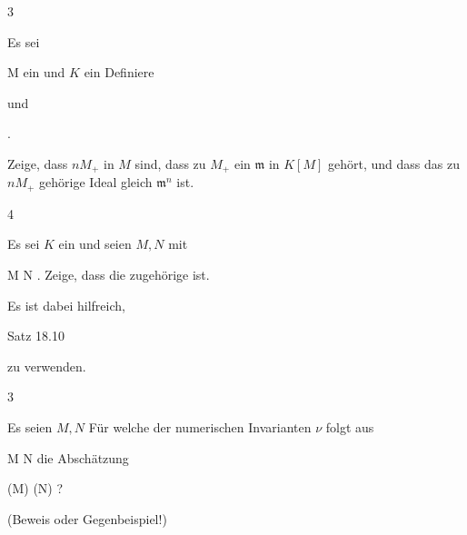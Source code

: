 {3}
{





Es sei

\mavergleichskette
{\vergleichskette
{ M
}
{ \subseteq }{ \N
}
{  }{
}
{    }{
}
{   }{
}
}
{}{}{}
ein
und $K$ ein
Definiere

 {  }

und

 { . }

Zeige, dass $nM_+$  in $M$ sind, dass zu $M_+$ ein
${\mathfrak m}$ in $K[M]$ gehört, und dass das zu $nM_+$ gehörige Ideal gleich ${\mathfrak m}^n$ ist.





}
{} {}

{4}
{





Es sei $K$ ein
und seien $M,N$
mit

\mavergleichskette
{\vergleichskette
{ M
}
{ \subseteq }{ N
}
{  }{
}
{    }{
}
{   }{
}
}
{}{}{.}
Zeige, dass die zugehörige
ist.





}
{Es ist dabei hilfreich,

Satz 18.10

zu verwenden.} {}

{3}
{





Es seien $M,N$
Für welche der numerischen Invarianten $\nu$
 {} {}
folgt aus

\mavergleichskette
{\vergleichskette
{ M
}
{ \subseteq }{ N
}
{  }{
}
{    }{
}
{   }{
}
}
{}{}{}
die Abschätzung

\mavergleichskette
{\vergleichskette
{ \nu(M)
}
{ \geq }{ \nu(N)
}
{  }{
}
{    }{
}
{   }{
}
}
{}{}{?}





}
{(Beweis oder Gegenbeispiel!)} {}

